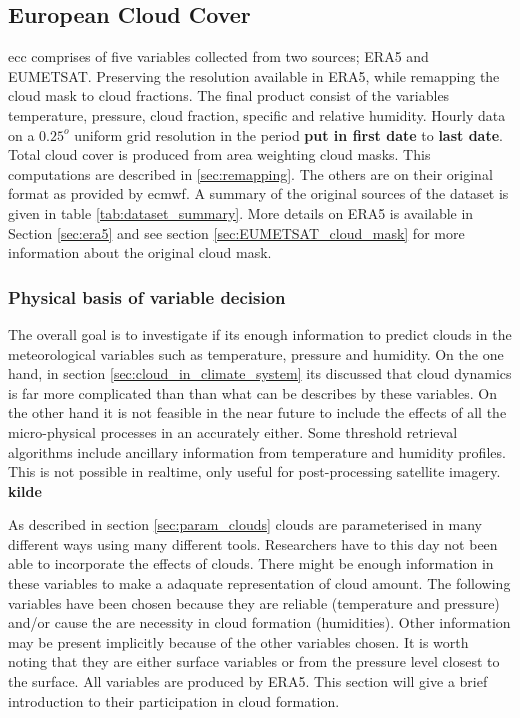 \subsection{European Cloud Cover} \label{sec:ecc}
\acrfull{ecc} comprises of five variables collected from two sources; ERA5 and EUMETSAT. Preserving the resolution available in ERA5, while remapping the cloud mask to cloud fractions. The final product consist of the variables temperature, pressure, cloud fraction, specific and relative humidity. Hourly data on a $0.25^o$ uniform grid resolution in the period \textbf{put in first date} to \textbf{last date}. Total cloud cover is produced from area weighting cloud masks. This computations are described in \ref{sec:remapping}. The others are on their original format as provided by \acrfull{ecmwf}. A summary of the original sources of the dataset is given in table \ref{tab:dataset_summary}. More details on ERA5 is available in Section \ref{sec:era5} and see section \ref{sec:EUMETSAT_cloud_mask} for more information about the original cloud mask. 


\subsubsection{Physical basis of variable decision} \label{sec:physical_basis}
The overall goal is to investigate if its enough information to predict clouds in the meteorological variables such as temperature, pressure and humidity. On the one hand, in section \ref{sec:cloud_in_climate_system} its discussed that cloud dynamics is far more complicated than than what can be describes by these variables. On the other hand it is not feasible in the near future to include the effects of all the micro-physical processes in an accurately either. Some threshold retrieval algorithms include ancillary information from temperature and humidity profiles. This is not possible in realtime, only useful for post-processing satellite imagery. \textbf{kilde}

As described in section \ref{sec:param_clouds} clouds are parameterised in many different ways using many different tools. Researchers have to this day not been able to incorporate the effects of clouds. There might be enough information in these variables to make a adaquate representation of cloud amount. The following variables have been chosen because they are reliable (temperature and pressure) and/or cause the are necessity in cloud formation (humidities). Other information may be present implicitly because of the other variables chosen. It is worth noting that they are either surface variables or from the pressure level closest to the surface. All variables are produced by ERA5. This section will give a brief introduction to their participation in cloud formation. 

